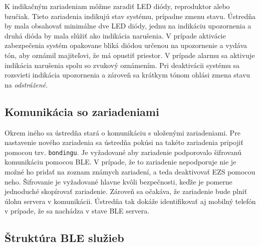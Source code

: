 K indikačným zariadeniam môžme zaradiť LED diódy, reproduktor alebo bzučiak. Tieto zariadenia indikujú stav systému, prípadne zmenu stavu. Ústredňa by mala obsahovať minimálne dve LED diódy, jednu na indikáciu upozornenia a druhá dióda by mala slúžiť ako indikácia narušenia. V prípade aktivácie zabezpečenia systém opakovane bliká diódou určenou na upozornenie a vydáva tón, aby oznámil majiteľovi, že má opustiť priestor. V prípade alarmu sa aktivuje indikácia narušenia spolu so zvukový oznámením. Pri deaktivácii systému sa rozsvieti indikácia upozornenia a zároveň sa krátkym tónom ohlási zmena stavu na \textit{odstrážené}.

\subsection{Komunikácia so zariadeniami}

Okrem iného sa ústredňa stará o komunikáciu s uloženými zariadeniami. Pre nastavenie nového zariadenia sa ústredňa pokúsi na takéto zariadenia pripojiť pomocou tzv. \texttt{bondingu}. Je vyžadované aby zariadenie podporovalo šifrovanú komunikáciu pomocou BLE. V prípade, že to zariadenie nepodporuje nie je možné ho pridať na zoznam známych zariadení, a teda deaktivovať EZS pomocou neho. Šifrovanie je vyžadované hlavne kvôli bezpečnosti, keďže je pomerne jednoduché skopírovať zariadenie. Zároveň sa očakáva, že zariadenie bude plniť úlohu servera v komunikácii. Ústredňa tak dokáže identifikovať aj mobilný telefón v prípade, že sa nachádza v stave BLE servera.

\subsection{Štruktúra BLE služieb}\label{sec:BLE_struc}

